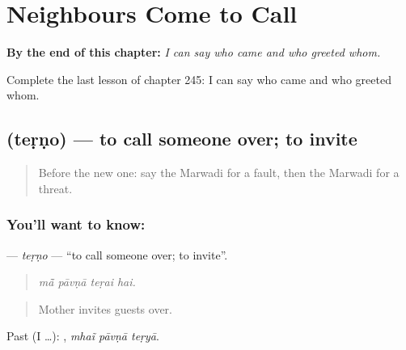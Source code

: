 
\chapter{Neighbours Come to Call}
\label{ch:mw-neighbours-come-to-call}

\begin{chapteropening}
\textbf{By the end of this chapter:} \emph{I can say who came and who greeted whom.}

Complete the last lesson of chapter 245: I can say who came and who greeted whom.
\end{chapteropening}

\section[\texorpdfstring{\mw{तेड़णो} (teṛṇo)}{तेड़णो (teṛṇo)}]{ (teṛṇo) — to call someone over; to invite}

\label{lesson:MW-C245-terno}



\begin{quote}
Before the new one: say the Marwadi for a fault, then the Marwadi for a threat.
\end{quote}

\subsection*{You'll want to know: }
\textbf{} — \emph{teṛṇo} — \textquotedblleft{}to call someone over; to invite\textquotedblright{}.

\begin{quote}
   
\end{quote}

\begin{quote}
\emph{mā̃ pāvṇā teṛai hai.}
\end{quote}

\begin{quote}
Mother invites guests over.
\end{quote}

Past (I …):   , \emph{mhaĩ pāvṇā teṛyā}.

